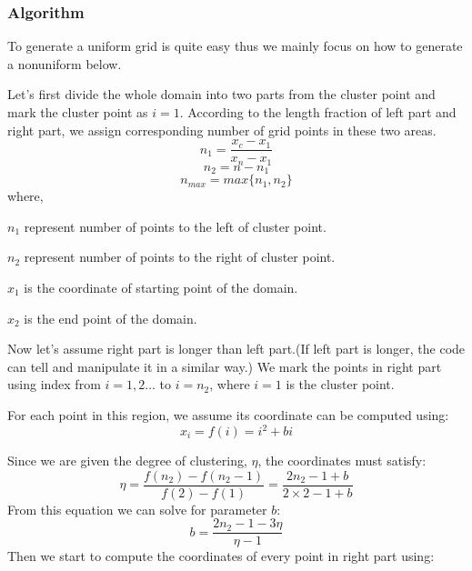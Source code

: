 \documentclass[11pt]{article}
\begin{document}
	\subsubsection{Algorithm}\label{sec:algorithm}
	    To generate a uniform grid is quite easy thus we mainly focus on how to generate a nonuniform below.\par
	    Let's first divide the whole domain into two parts from the cluster point and mark the cluster point as $i=1$. According to the length fraction of left part and right part, we assign corresponding number of grid points in these two areas. 
	    \begin{equation}
		n_1 = \frac{x_c-x_1}{x_n-x_1}
	    \end{equation}
	    \begin{equation}
		n_2 = n - n_1
	    \end{equation}
	    \begin{equation}
		n_{max} = max\{n_1,n_2\}
	    \end{equation}
	    where, \par
	    $n_1$ represent number of points to the left of cluster point.\par
	    $n_2$ represent number of points to the right of cluster point. \par 
	    $x_1$ is the coordinate of starting point of the domain. \par
	    $x_2$ is the end point of the domain. \par
	    Now let's assume right part is longer than left part.(If left part is longer, the code can tell and manipulate it in a similar way.) We mark the points in right part using index from $i=1,2\dots$ to $i=n_2$, where $i=1$ is the cluster point. \par
	For each point in this region, we assume its coordinate can be computed using:\begin{equation}x_i=f(i)=i^2+bi \end{equation}\par
	    Since we are given the degree of clustering, $\eta$, the coordinates must satisfy:
	    \begin{equation}
		\eta=\frac{f(n_2)-f(n_2-1)}{f(2)-f(1)}=\frac{2n_2-1+b}{2\times2-1+b}
	    \end{equation}
	    From this equation we can solve for parameter $b$:
	    \begin{equation}
		b=\frac{2n_2-1-3\eta}{\eta-1}
	    \end{equation}
	    Then we start to compute the coordinates of every point in right part using:
\end{document}

